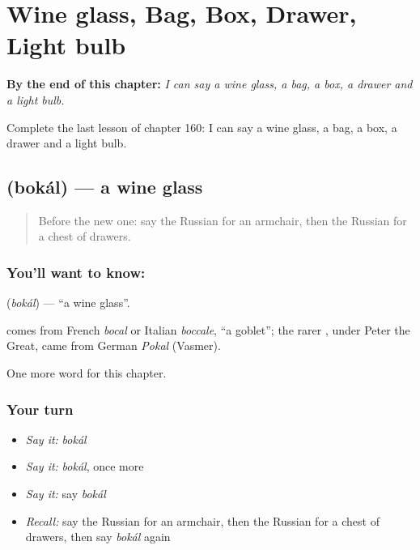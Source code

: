 
\chapter{Wine glass, Bag, Box, Drawer, Light bulb}
\label{ch:ru-wine-glass-bag-box-drawer-light-bulb}

\begin{chapteropening}
\textbf{By the end of this chapter:} \emph{I can say a wine glass, a bag, a box, a drawer and a light bulb.}

Complete the last lesson of chapter 160: I can say a wine glass, a bag, a box, a drawer and a light bulb.
\end{chapteropening}

\section[\texorpdfstring{\ru{бокал} (bokál)}{бокал (bokál)}]{ (bokál) — a wine glass}

\label{lesson:RU-C160-bokal}



\begin{quote}
Before the new one: say the Russian for an armchair, then the Russian for a chest of drawers.
\end{quote}

\subsection*{You'll want to know: }
\textbf{} (\emph{bokál}) — \textquotedblleft{}a wine glass\textquotedblright{}.

\begin{cousinweb}
\textbf{} comes from French \emph{bocal} or Italian \emph{boccale}, \textquotedblleft{}a goblet\textquotedblright{}; the rarer \emph{}, under Peter the Great, came from German \emph{Pokal} (Vasmer).
\end{cousinweb}

\begin{grammarlens}[title={What you've built}]
One more word for this chapter.
\end{grammarlens}

\subsection*{Your turn}
\begin{itemize}
\raggedright
  \item \emph{Say it:} \emph{bokál}
  \item \emph{Say it:} \emph{bokál}, once more
  \item \emph{Say it:} say \emph{bokál}
  \item \emph{Recall:} say the Russian for an armchair, then the Russian for a chest of drawers, then say \emph{bokál} again
\end{itemize}

